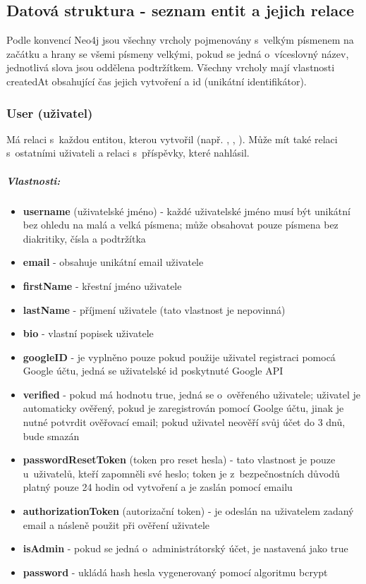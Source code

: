 \documentclass[12pt, a4paper,
  oneside,      %
]{report}
\newenvironment{propertiesItemize}{
\begin{itemize}{ 
  }}
  {\end{itemize}}
\begin{document}
\subsection{Datová struktura - seznam entit a jejich relace}
Podle konvencí Neo4j jsou všechny vrcholy pojmenovány s~velkým písmenem na začátku a hrany se všemi písmeny velkými, pokud se jedná o~víceslovný název, jednotlivá slova jsou oddělena podtržítkem. \cite{Neo4jNamingRules}
Všechny vrcholy mají vlastnosti createdAt obsahující čas jejich vytvoření a id (unikátní identifikátor).

\subsubsection{User (uživatel)}  Má relaci  s~každou entitou, kterou vytvořil (např. , , ). Může mít také relaci  s~ostatními uživateli a relaci  s~příspěvky, které nahlásil.
\subparagraph{Vlastnosti:}
\begin{propertiesItemize}
	\item \textbf{username} (uživatelské jméno) - každé uživatelské jméno musí být unikátní bez ohledu na malá a velká písmena; může obsahovat pouze písmena bez diakritiky, čísla a podtržítka
	\item \textbf{email} - obsahuje unikátní email uživatele
	\item \textbf{firstName} - křestní jméno uživatele
	\item \textbf{lastName} - příjmení uživatele (tato vlastnost je nepovinná)
	\item \textbf{bio} - vlastní popisek uživatele
	\item \textbf{googleID} - je vyplněno pouze pokud použije uživatel registraci pomocá Google účtu, jedná se uživatelské id poskytnuté Google API
	\item \textbf{verified} - pokud má hodnotu true, jedná se o~ověřeného uživatele; uživatel je automaticky ověřený, pokud je zaregistrován pomocí Goolge účtu, jinak je nutné potvrdit ověřovací email; pokud uživatel neověří svůj účet do 3 dnů, bude smazán
	\item \textbf{passwordResetToken} (token pro reset hesla) - tato vlastnost je pouze u~uživatelů, kteří zapomněli své heslo; token je z~bezpečnostních důvodů platný pouze 24 hodin od vytvoření a je zaslán pomocí emailu
	\item \textbf{authorizationToken} (autorizační token) - je odeslán na uživatelem zadaný email a násleně použit při ověření uživatele
	\item \textbf{isAdmin} - pokud se jedná o~administrátorský účet, je nastavená jako true
	\item \textbf{password} - ukládá hash hesla vygenerovaný pomocí algoritmu bcrypt
\end{propertiesItemize}
\end{document}
